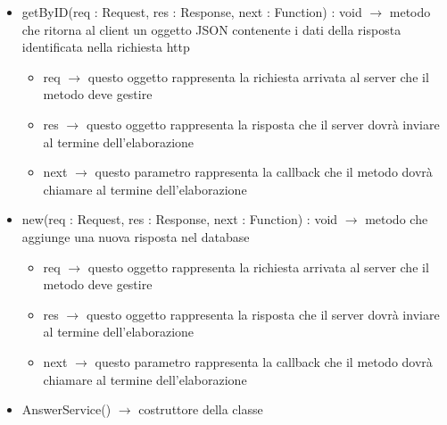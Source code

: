 \begin{description}
\begin{itemize}
	\item getByID(req : Request, res : Response, next : Function) : void $\rightarrow$ metodo che ritorna al client un oggetto JSON contenente i dati della risposta identificata nella richiesta http\begin{itemize}
		\item req $\rightarrow$ questo oggetto rappresenta la richiesta arrivata al server che il metodo deve gestire
		\item res $\rightarrow$ questo oggetto rappresenta la risposta che il server dovrà inviare al termine dell'elaborazione
		\item next $\rightarrow$ questo parametro rappresenta la callback che il metodo dovrà chiamare al termine dell’elaborazione
	\end{itemize}
	
	\item new(req : Request, res : Response, next : Function) : void $\rightarrow$ metodo che aggiunge una nuova risposta nel database\begin{itemize}
		\item req $\rightarrow$ questo oggetto rappresenta la richiesta arrivata al server che il metodo deve gestire
		\item res $\rightarrow$ questo oggetto rappresenta la risposta che il server dovrà inviare al termine dell'elaborazione
		\item next $\rightarrow$ questo parametro rappresenta la callback che il metodo dovrà chiamare al termine dell’elaborazione
	\end{itemize}
	
	\item AnswerService() $\rightarrow$ costruttore della classe
\end{itemize}

\end{description}

\vspace{0.5cm}
